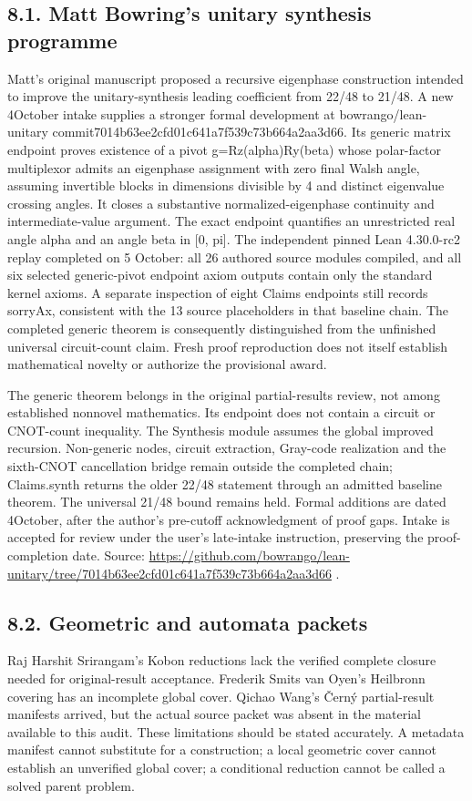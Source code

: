 \documentclass[11pt,a4paper]{article}
\begin{document}
\subsection{8.1. Matt Bowring's unitary synthesis programme}
Matt's original manuscript proposed a recursive eigenphase construction intended to improve the unitary-synthesis leading coefficient from 22/48 to 21/48. A new 4October intake supplies a stronger formal development at bowrango/lean-unitary commit7014b63ee2cfd01c641a7f539c73b664a2aa3d66. Its generic matrix endpoint proves existence of a pivot g=Rz(alpha)Ry(beta) whose polar-factor multiplexor admits an eigenphase assignment with zero final Walsh angle, assuming invertible blocks in dimensions divisible by 4 and distinct eigenvalue crossing angles. It closes a substantive normalized-eigenphase continuity and intermediate-value argument. The exact endpoint quantifies an unrestricted real angle alpha and an angle beta in [0, pi]. The independent pinned Lean 4.30.0-rc2 replay completed on 5 October: all 26 authored source modules compiled, and all six selected generic-pivot endpoint axiom outputs contain only the standard kernel axioms. A separate inspection of eight Claims endpoints still records sorryAx, consistent with the 13 source placeholders in that baseline chain. The completed generic theorem is consequently distinguished from the unfinished universal circuit-count claim. Fresh proof reproduction does not itself establish mathematical novelty or authorize the provisional award.

The generic theorem belongs in the original partial-results review, not among established nonnovel mathematics. Its endpoint does not contain a circuit or CNOT-count inequality. The Synthesis module assumes the global improved recursion. Non-generic nodes, circuit extraction, Gray-code realization and the sixth-CNOT cancellation bridge remain outside the completed chain; Claims.synth returns the older 22/48 statement through an admitted baseline theorem. The universal 21/48 bound remains held. Formal additions are dated 4October, after the author's pre-cutoff acknowledgment of proof gaps. Intake is accepted for review under the user's late-intake instruction, preserving the proof-completion date. Source: \url{https://github.com/bowrango/lean-unitary/tree/7014b63ee2cfd01c641a7f539c73b664a2aa3d66} .

\subsection{8.2. Geometric and automata packets}
Raj Harshit Srirangam's Kobon reductions lack the verified complete closure needed for original-result acceptance. Frederik Smits van Oyen's Heilbronn covering has an incomplete global cover. Qichao Wang's Černý partial-result manifests arrived, but the actual source packet was absent in the material available to this audit. These limitations should be stated accurately. A metadata manifest cannot substitute for a construction; a local geometric cover cannot establish an unverified global cover; a conditional reduction cannot be called a solved parent problem.
\end{document}
